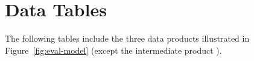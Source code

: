 \chapter{Data Tables}\label{tables}

The following tables include the three data products illustrated in Figure~\ref{fig:eval-model} (except the intermediate product ).